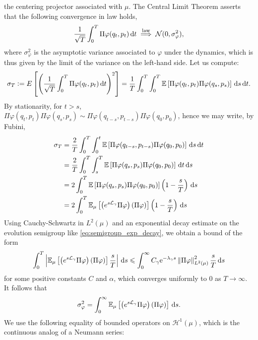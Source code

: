         the centering projector associated with $\mu$. The Central Limit Theorem asserts that the following convergence in law holds,
        \begin{equation}
            \label{eq:clt_diffusion}
            \frac1{\sqrt{T}}\int_0^T\Pi\varphi(q_t,p_t)\,\mathrm{d} t \overset{\mathrm{law}}{\implies} \mathcal N(0,\sigma_{\varphi}^2),
        \end{equation}
        where $\sigma_{\varphi}^2$ is the asymptotic variance associated to $\varphi$ under the dynamics, which is thus given by the limit of the variance on the left-hand side. Let us compute:
        \[\sigma_T\mathrel{\mathop:}= E\left[\left(\frac1{\sqrt{T}}\int_0^T\Pi\varphi(q_t,p_t)\,\mathrm{d} t\right)^2\right]=\frac1T\int_0^T\int_0^T\mathbb{E}\left[\Pi\varphi(q_t,p_t)\Pi\varphi(q_s,p_s)\right]\,\mathrm{d} s\,\mathrm{d} t.\]
        By stationarity, for $t>s$, $\Pi\varphi(q_t,p_t)\Pi\varphi(q_s,p_s)\sim \Pi\varphi(q_{t-s},p_{t-s})\Pi\varphi(q_0,p_0)$, hence we may write, by Fubini, 
        \begin{align*}\sigma_T &= \frac2T\int_0^T\int_0^t\mathbb{E}\left[\Pi\varphi(q_{t-s},p_{t-s})\Pi\varphi(q_0,p_0)\right]\,\mathrm{d} s\,\mathrm{d} t\\
             &= \frac2T\int_0^T\int_s^T\mathbb{E}\left[\Pi\varphi(q_{s},p_{s})\Pi\varphi(q_0,p_0)\right]\,\mathrm{d} t\,\mathrm{d} s\\
             &=2\int_0^T\mathbb{E}\left[\Pi\varphi(q_{s},p_{s})\Pi\varphi(q_0,p_0)\right]\left(1-\frac{s}{T}\right)\,\mathrm{d} s\\
             &=2\int_0^T\mathbb{E}_\mu\left[\left(e^{s\mathcal{L}_\gamma}\Pi\varphi\right)\left(\Pi\varphi\right)\right]\left(1-\frac{s}{T}\right)\,\mathrm{d} s
        \end{align*}
        Using Cauchy-Schwartz in $L^2(\mu)$ and an exponential decay estimate on the evolution semigroup like \eqref{eq:semigroup_exp_decay}, we obtain a bound of the form
        \[\int_0^T\left|\mathbb{E}_\mu\left[\left(e^{s\mathcal{L}_\gamma}\Pi\varphi\right)\left(\Pi\varphi\right)\right]\frac{s}{T}\right|\,\mathrm{d} s\leqslant \int_0^\infty C_\gamma\mathrm{e}^{-\lambda_\gamma s}\left\|\Pi\varphi\right\|^2_{L^2(\mu)}\frac{s}{T}\,\mathrm{d} s\]
        for some positive constants $C$ and $\alpha$, which converges uniformly to $0$ as $T\to \infty$. It follows that 
        \begin{equation}
            \label{eq:asymptotic_variance_with_semigroup}
            \sigma_{\varphi}^2=\int_0^\infty \mathbb{E}_\mu\left[\left(e^{s\mathcal{L}_\gamma}\Pi\varphi\right)\left(\Pi\varphi\right)\right]\,\mathrm{d} s.
        \end{equation}
        We use the following equality of bounded operators on $\mathcal{H}^1(\mu)$, which is the continuous analog of a Neumann series:
